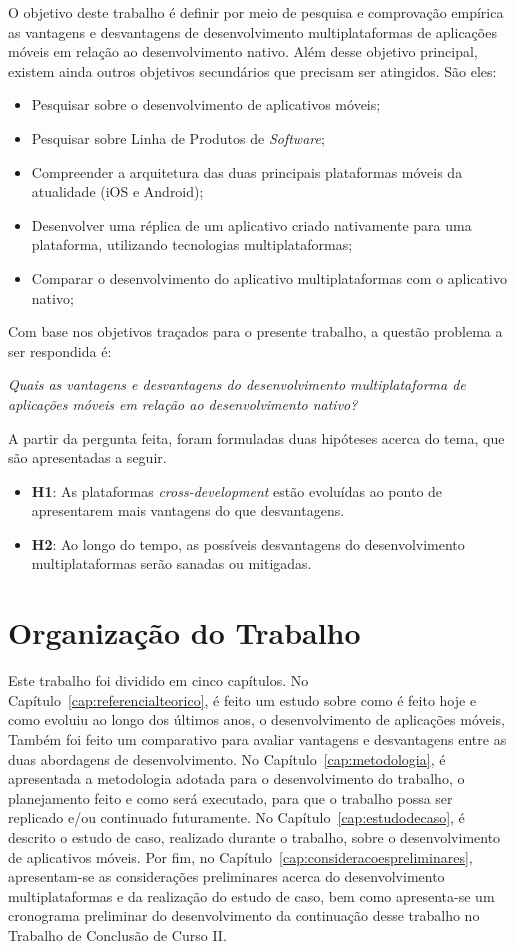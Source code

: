 O objetivo deste trabalho é definir por meio de pesquisa e comprovação empírica as vantagens e desvantagens de desenvolvimento multiplataformas de aplicações móveis em relação ao desenvolvimento nativo. 
Além desse objetivo principal, existem ainda outros objetivos secundários que precisam ser atingidos. São eles: 
\begin{itemize}
    \item Pesquisar sobre o desenvolvimento de aplicativos móveis;
    \item Pesquisar sobre Linha de Produtos de \textit{Software};
    \item Compreender a arquitetura das duas principais plataformas móveis da atualidade (iOS e Android);
    \item Desenvolver uma réplica de um aplicativo criado nativamente para uma plataforma, utilizando tecnologias multiplataformas;
    \item Comparar o desenvolvimento do aplicativo multiplataformas com o aplicativo nativo;
\end{itemize}
Com base nos objetivos traçados para o presente trabalho, a questão problema a ser respondida é:
\begin{center}
    \textit{Quais as vantagens e desvantagens do desenvolvimento multiplataforma de aplicações móveis em relação ao desenvolvimento nativo?}
\end{center}
A partir da pergunta feita, foram formuladas duas hipóteses acerca do tema, que são apresentadas a seguir.
\begin{itemize}
    \item \textbf{H1}: As plataformas \textit{cross-development} estão evoluídas ao ponto de apresentarem mais vantagens do que desvantagens.
    \item \textbf{H2}: Ao longo do tempo, as possíveis desvantagens do desenvolvimento multiplataformas serão sanadas ou mitigadas.
\end{itemize}

\section{Organização do Trabalho}\label{sec:organizacao}

Este trabalho foi dividido em cinco capítulos. %
No Capítulo~\ref{cap:referencialteorico}, é feito um estudo sobre como é feito hoje e como evoluiu ao longo dos últimos anos, o desenvolvimento de aplicações 
móveis, Também foi feito um comparativo para avaliar vantagens e desvantagens entre as duas abordagens de desenvolvimento. 
No Capítulo~\ref{cap:metodologia}, é apresentada a metodologia adotada para o desenvolvimento do trabalho, o planejamento feito e como será executado, para que 
o trabalho possa ser replicado e/ou continuado futuramente.  
No Capítulo~\ref{cap:estudodecaso}, é descrito o estudo de caso, realizado durante o trabalho, sobre o desenvolvimento de aplicativos móveis.
Por fim, no Capítulo~\ref{cap:consideracoespreliminares}, apresentam-se as considerações preliminares acerca do desenvolvimento multiplataformas e da realização do estudo de caso, bem como apresenta-se um 
cronograma preliminar do desenvolvimento da continuação desse trabalho no Trabalho de Conclusão de Curso II. 